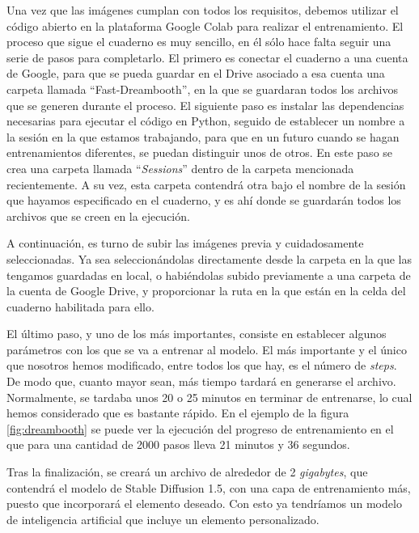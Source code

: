 Una vez que las imágenes cumplan con todos los requisitos, debemos utilizar el código abierto en la plataforma Google Colab para realizar el entrenamiento. 
El proceso que sigue el cuaderno es muy sencillo, en él sólo hace falta seguir una serie de pasos para completarlo. El primero es conectar el cuaderno a una cuenta de Google, para que se pueda guardar en el Drive asociado a esa cuenta una carpeta llamada ``Fast-Dreambooth'', en la que se guardaran todos los archivos que se generen durante el proceso. El siguiente paso es instalar las dependencias necesarias para ejecutar el código en Python, seguido de establecer un nombre a la sesión en la que estamos trabajando, para que en un futuro cuando se hagan entrenamientos diferentes, se puedan distinguir unos de otros. En este paso se crea una carpeta llamada ``\textit{Sessions}'' dentro de la carpeta mencionada recientemente. A su vez, esta carpeta contendrá otra bajo el nombre de la sesión que hayamos especificado en el cuaderno, y es ahí donde se guardarán todos los archivos que se creen en la ejecución. 

A continuación, es turno de subir las imágenes previa y cuidadosamente seleccionadas. Ya sea seleccionándolas directamente desde la carpeta en la que las tengamos guardadas en local, o habiéndolas subido previamente a una carpeta de la cuenta de Google Drive, y proporcionar la ruta en la que están en la celda del cuaderno habilitada para ello. 

El último paso, y uno de los más importantes, consiste en establecer algunos parámetros con los que se va a entrenar al modelo. El más importante y el único que nosotros hemos modificado, entre todos los que hay, es el número de \textit{steps}. De modo que, cuanto mayor sean, más tiempo tardará en generarse el archivo. Normalmente, se tardaba unos 20 o 25 minutos en terminar de entrenarse, lo cual hemos considerado que es bastante rápido. En el ejemplo de la figura \ref{fig:dreambooth} se puede ver la ejecución del progreso de entrenamiento en el que para una cantidad de 2000 pasos lleva 21 minutos y 36 segundos. 

Tras la finalización, se creará un archivo de alrededor de 2 \textit{gigabytes}, que contendrá el modelo de Stable Diffusion 1.5, con una capa de entrenamiento más, puesto que incorporará el elemento deseado. Con esto ya tendríamos un modelo de inteligencia artificial que incluye un elemento personalizado.\\

